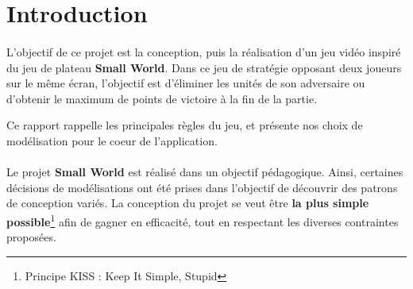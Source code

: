 \section*{Introduction}

\paragraph{}
L'objectif de ce projet est la conception, puis la réalisation d'un jeu vidéo inspiré du jeu de plateau \textbf{Small World}.
Dans ce jeu de stratégie opposant deux joueurs sur le même écran, l'objectif est d'éliminer les unités de son adversaire ou d'obtenir le maximum de points de victoire à la fin de la partie.

Ce rapport rappelle les principales règles du jeu, et présente nos choix de modélisation pour le coeur de l'application.

\paragraph{}
Le projet \textbf{Small World} est réalisé dans un objectif pédagogique. Ainsi, certaines décisions de modélisations ont été prises dans l'objectif de découvrir des patrons de conception variés.
La conception du projet se veut être \textbf{la plus simple possible}\footnote{Principe KISS : \og{} Keep It Simple, Stupid \fg{}} afin de gagner en efficacité, tout en respectant les diverses contraintes proposées.


